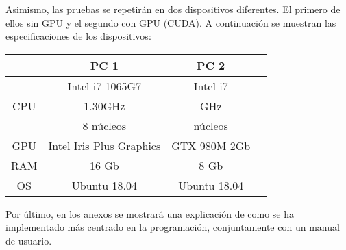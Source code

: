 Asimismo, las pruebas se repetirán en dos dispositivos diferentes. El primero de ellos sin GPU y el segundo con GPU (CUDA). A continuación se muestran las especificaciones de los dispositivos:

\begin{center}
	\begin{tabular}{ |c|c|c|c| } 
		\hline
		 & PC 1 & PC 2 \\
		\hline
		\multirow{3}{4em}{CPU} & Intel i7-1065G7 & Intel i7 \\ 
		& 1.30GHz & GHz \\ 
		& 8 núcleos & núcleos \\ 
		\hline
		GPU & Intel Iris Plus Graphics  & GTX 980M 2Gb \\
		\hline
		RAM & 16 Gb & 8 Gb \\
		\hline
		OS & Ubuntu 18.04 & Ubuntu 18.04 \\
		\hline
	\end{tabular}
\end{center}

\vspace{0.3cm}

Por último, en los anexos se mostrará una explicación de como se ha implementado más centrado en la programación, conjuntamente con un manual de usuario.
